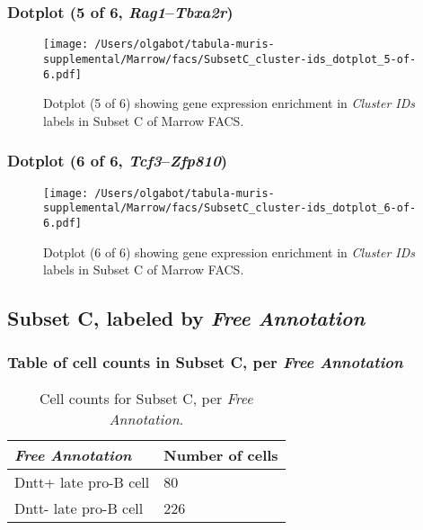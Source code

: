 \clearpage

\subsubsection{Dotplot (5 of 6, \emph{Rag1}--\emph{Tbxa2r})}
\begin{figure}[h]
\centering
\texttt{[image: /Users/olgabot/tabula-muris-supplemental/Marrow/facs/SubsetC\_cluster-ids\_dotplot\_5-of-6.pdf]}

\caption{ Dotplot (5 of 6)  showing gene expression enrichment in \emph{Cluster IDs} labels in Subset C of Marrow FACS. }
\end{figure}


\clearpage

\subsubsection{Dotplot (6 of 6, \emph{Tcf3}--\emph{Zfp810})}
\begin{figure}[h]
\centering
\texttt{[image: /Users/olgabot/tabula-muris-supplemental/Marrow/facs/SubsetC\_cluster-ids\_dotplot\_6-of-6.pdf]}

\caption{ Dotplot (6 of 6)  showing gene expression enrichment in \emph{Cluster IDs} labels in Subset C of Marrow FACS. }
\end{figure}


\clearpage

\subsection{Subset C, labeled by \emph{Free Annotation}}
\subsubsection{Table of cell counts in Subset C, per \emph{Free Annotation}}\begin{table}[h]
\centering
\label{my-label}
\begin{tabular}{@{}ll@{}}
\toprule

\emph{Free Annotation}& Number of cells \\ \midrule
Dntt+ late pro-B cell & 80 \\

Dntt- late pro-B cell & 226 \\
\bottomrule
\end{tabular}
\caption{Cell counts for Subset C, per \emph{Free Annotation}.}
\end{table}

